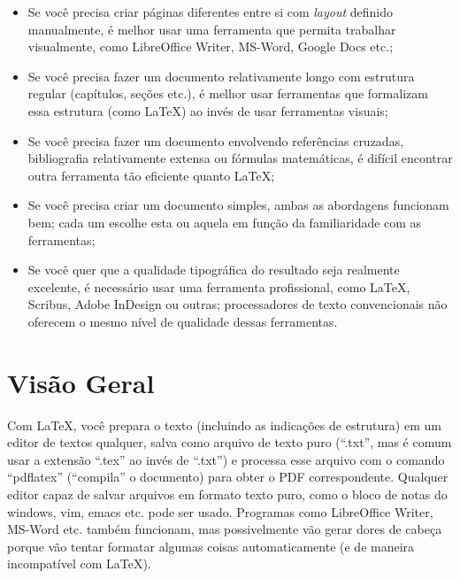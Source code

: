 \begin{itemize}
\item Se você precisa criar páginas diferentes entre si com \emph{layout}
definido manualmente, é melhor usar uma ferramenta que permita trabalhar
visualmente, como LibreOffice Writer, MS-Word, Google Docs etc.;

\item Se você precisa fazer um documento relativamente longo com estrutura
regular (capítulos, seções etc.), é melhor usar ferramentas que formalizam
essa estrutura (como \LaTeX{}) ao invés de usar ferramentas visuais;

\item Se você precisa fazer um documento envolvendo referências cruzadas,
bibliografia relativamente extensa ou fórmulas matemáticas, é difícil
encontrar outra ferramenta tão eficiente quanto \LaTeX{};

\item Se você precisa criar um documento simples, ambas as abordagens
funcionam bem; cada um escolhe esta ou aquela em função da familiaridade
com as ferramentas;

\item Se você quer que a qualidade tipográfica do resultado seja realmente
excelente, é necessário usar uma ferramenta profissional, como \LaTeX{},
Scribus, Adobe InDesign ou outras; processadores de texto convencionais não
oferecem o mesmo nível de qualidade dessas ferramentas.
\end{itemize}

\section{Visão Geral}

Com \LaTeX{}, você prepara o texto (incluindo as indicações de estrutura) em
um editor de textos qualquer, salva como arquivo de texto puro (``.txt'',
mas é comum usar a extensão ``.tex'' ao invés de ``.txt'') e processa esse
arquivo com o comando ``pdflatex'' (``compila'' o documento) para obter o
PDF correspondente. Qualquer editor capaz de salvar arquivos em formato
texto puro, como o bloco de notas do windows, vim, emacs etc. pode ser usado.
Programas como LibreOffice Writer, MS-Word etc. também funcionam, mas
possivelmente vão gerar dores de cabeça porque vão tentar formatar algumas
coisas automaticamente (e de maneira incompatível com \LaTeX{}).

